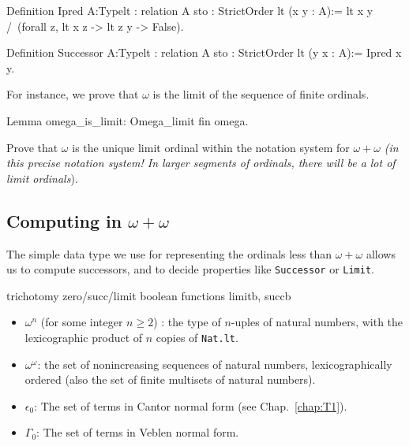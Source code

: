 \begin{Coqsrc}
Definition Ipred {A:Type}{lt : relation A}
           {sto : StrictOrder lt} (x y : A):=
  lt x y /\ (forall z,  lt x z -> lt z y -> False).

Definition Successor {A:Type}{lt : relation A}
           {sto : StrictOrder lt} (y x : A):= Ipred x y.
\end{Coqsrc}


For instance, 
we prove that $\omega$ is the limit of the sequence  of finite ordinals.

  \begin{Coqsrc}
Lemma omega_is_limit: Omega_limit fin omega.
\end{Coqsrc}


\begin{exercise}
Prove that $\omega$ is the unique   limit ordinal within the notation system for $\omega+\omega$
\emph{(in this precise notation system! In larger segments of 
ordinals, there will be \emph{a lot} of limit ordinals}).
\end{exercise}


\subsection{Computing in \texorpdfstring{$\omega+\omega$}{omega+omega}}

The simple data type we use for representing the ordinals less than $\omega+\omega$ allows us to compute successors, and to decide properties like \texttt{Successor} or \texttt{Limit}. 








\begin{todo}
trichotomy zero/succ/limit
boolean functions limitb, succb


\end{todo}
\begin{itemize}
\item $\omega^n$ (for some  integer  $n\geq 2$) : the type of $n$-uples of natural numbers, with the lexicographic product of $n$ copies of \texttt{Nat.lt}.
\item  $\omega^\omega$: the set of nonincreasing sequences of natural numbers, lexicographically ordered (also the set of finite multisets of natural numbers).
\item $\epsilon_0$: The set of terms in Cantor normal form (see Chap.~\ref{chap:T1}).
\item $\Gamma_0$: The set of terms in Veblen normal form.
\end{itemize}



